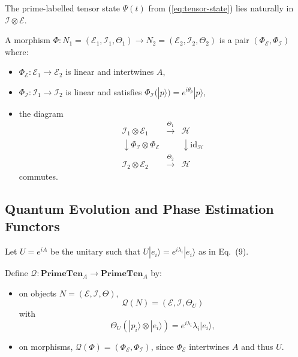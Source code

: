 \documentclass[11pt]{article}
\begin{document}
The prime-labelled tensor state $\Psi(t)$ from
(\ref{eq:tensor-state}) lies naturally in $\mathcal{I}\otimes\mathcal{E}$.

\begin{definition}[Morphisms]
A morphism $\Phi : N_1=(\mathcal{E}_1,\mathcal{I}_1,\Theta_1)
\to N_2=(\mathcal{E}_2,\mathcal{I}_2,\Theta_2)$ is a pair
$(\Phi_{\mathcal{E}},\Phi_{\mathcal{I}})$ where:
\begin{itemize}
  \item $\Phi_{\mathcal{E}} : \mathcal{E}_1 \to \mathcal{E}_2$ is
    linear and intertwines $A$,
  \item $\Phi_{\mathcal{I}} : \mathcal{I}_1 \to \mathcal{I}_2$ is
    linear and satisfies $\Phi_{\mathcal{I}}(|p\rangle)
    = e^{i\theta_p}|p\rangle$,
  \item the diagram
  \[
  \begin{array}{ccc}
  \mathcal{I}_1\otimes\mathcal{E}_1 & \xrightarrow{\Theta_1} & \mathcal{H} \\
  \downarrow \scriptstyle{\Phi_{\mathcal{I}}\otimes\Phi_{\mathcal{E}}} & &
  \downarrow \scriptstyle{\mathrm{id}_{\mathcal{H}}} \\
  \mathcal{I}_2\otimes\mathcal{E}_2 & \xrightarrow{\Theta_2} & \mathcal{H}
  \end{array}
  \]
  commutes.
\end{itemize}
\end{definition}

\subsection{Quantum Evolution and Phase Estimation Functors}

Let $U=e^{iA}$ be the unitary such that
$U|e_i\rangle = e^{i\lambda_i}|e_i\rangle$ as in Eq.~(9).\cite{PrimeEigenSolvers}

\begin{definition}
Define $\mathcal{Q} : \mathbf{PrimeTen}_A \to
\mathbf{PrimeTen}_A$ by:
\begin{itemize}
  \item on objects $N=(\mathcal{E},\mathcal{I},\Theta)$,
    \[
    \mathcal{Q}(N) = (\mathcal{E},\mathcal{I},\Theta_U)
    \]
    with
    \[
    \Theta_U(|p_i\rangle\otimes|e_i\rangle) =
    e^{i\lambda_i}\lambda_i |e_i\rangle,
    \]
  \item on morphisms, $\mathcal{Q}(\Phi) = (\Phi_{\mathcal{E}},\Phi_{\mathcal{I}})$,
    since $\Phi_{\mathcal{E}}$ intertwines $A$ and thus $U$.
\end{itemize}
\end{definition}
\end{document}
